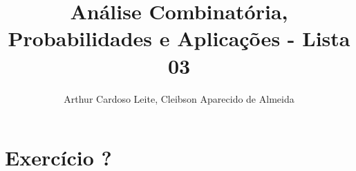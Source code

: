 \documentclass[12pt]{article}
\title{Análise Combinatória, Probabilidades e Aplicações - Lista 03}
\author{{Arthur Cardoso Leite}, {Cleibson Aparecido de Almeida}}
\begin{document}
\maketitle

\section*{Exercício ?}




\end{document}
